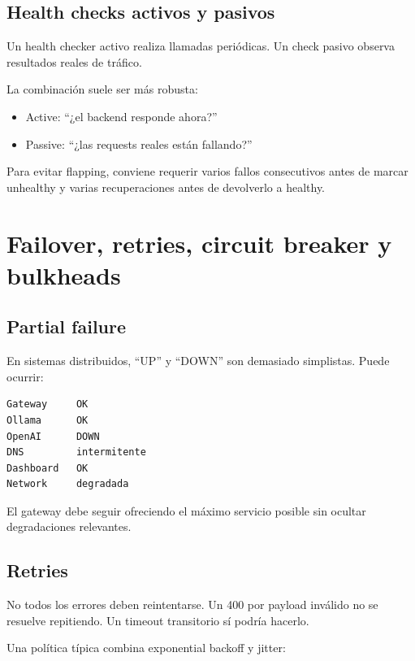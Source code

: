 \documentclass[11pt,a4paper]{article}
\begin{document}
\subsection{Health checks activos y pasivos}

Un health checker activo realiza llamadas periódicas. Un check pasivo observa resultados reales de tráfico.

La combinación suele ser más robusta:

\begin{itemize}
  \item Active: ``¿el backend responde ahora?''
  \item Passive: ``¿las requests reales están fallando?''
\end{itemize}

Para evitar flapping, conviene requerir varios fallos consecutivos antes de marcar unhealthy y varias recuperaciones antes de devolverlo a healthy.

\section{Failover, retries, circuit breaker y bulkheads}

\subsection{Partial failure}

En sistemas distribuidos, ``UP'' y ``DOWN'' son demasiado simplistas. Puede ocurrir:

\begin{verbatim}
Gateway     OK
Ollama      OK
OpenAI      DOWN
DNS         intermitente
Dashboard   OK
Network     degradada
\end{verbatim}

El gateway debe seguir ofreciendo el máximo servicio posible sin ocultar degradaciones relevantes.

\subsection{Retries}

No todos los errores deben reintentarse. Un 400 por payload inválido no se resuelve repitiendo. Un timeout transitorio sí podría hacerlo.

Una política típica combina exponential backoff y jitter:
\end{document}
